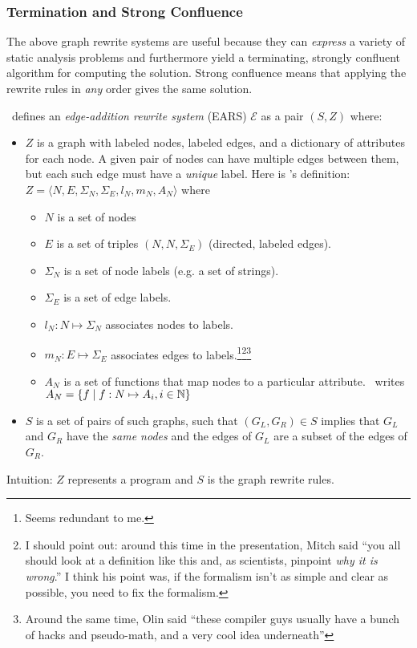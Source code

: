 \documentclass{article}
\begin{document}
\subsubsection*{Termination and Strong Confluence}

The above graph rewrite systems are useful because they can \emph{express} a variety of static analysis problems and furthermore yield a terminating, strongly confluent algorithm for computing the solution.
Strong confluence means that applying the rewrite rules in \emph{any} order gives the same solution.

\assmann\ defines an \emph{edge-addition rewrite system} (EARS) $\mathcal{E}$ as a pair $(S, Z)$ where:
\begin{itemize}
\item $Z$ is a graph with labeled nodes, labeled edges, and a dictionary of attributes for each node.
  A given pair of nodes can have multiple edges between them, but each such edge must have a \emph{unique} label.
  Here is \assmann{}'s definition: $Z = \langle N, E, \Sigma_N, \Sigma_E, l_N, m_N, A_N\rangle$ where
  \begin{itemize}
  \item $N$ is a set of nodes
  \item $E$ is a set of triples $(N, N, \Sigma_E)$ (directed, labeled edges).
  \item $\Sigma_N$ is a set of node labels (e.g. a set of strings).
  \item $\Sigma_E$ is a set of edge labels.
  \item $l_N : N \mapsto \Sigma_N$ associates nodes to labels.
  \item $m_N : E \mapsto \Sigma_E$ associates edges to labels.\footnote{Seems redundant to me.}\footnote{I should point out: around this time in the presentation, Mitch said ``you all should look at a definition like this and, as scientists, pinpoint \emph{why it is wrong}.'' I think his point was, if the formalism isn't as simple and clear as possible, you need to fix the formalism.}\footnote{Around the same time, Olin said ``these compiler guys usually have a bunch of hacks and pseudo-math, and a very cool idea underneath''}
  \item $A_N$ is a set of functions that map nodes to a particular attribute.
    \assmann\ writes $A_N = \{ f \mid f : N \mapsto A_i, i \in \mathbb{N} \}$
  \end{itemize}
\item $S$ is a set of pairs of such graphs, such that $(G_L, G_R) \in S$ implies
 that $G_L$ and $G_R$ have the \emph{same nodes} and the edges of $G_L$ are a subset of the edges of $G_R$.
\end{itemize}
Intuition: $Z$ represents a program and $S$ is the graph rewrite rules.
\end{document}
